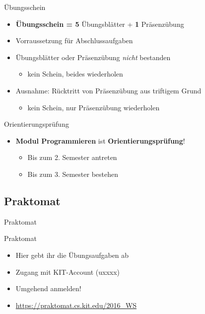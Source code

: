 \documentclass[18pt]{beamer}
\begin{document}
\begin{frame}{Übungsschein}
    \begin{itemize}
        \item \textbf{Übungsschein = \alert{5}} Übungsblätter + \textbf{\alert{1}} Präsenzübung
        \pause
        \item \alert{Vorraussetzung für Abschlussaufgaben}
        \pause
        \item Übungsblätter oder Präsenzübung \textit{nicht} bestanden
        \begin{itemize}
            \item kein Schein, beides wiederholen
        \end{itemize}
        \pause
        \item Ausnahme: Rücktritt von Präsenzübung aus triftigem Grund
        \begin{itemize}
            \item kein Schein, nur Präsenzübung wiederholen
        \end{itemize}
    \end{itemize}

\end{frame}

\begin{frame}{Orientierungsprüfung}
    \begin{itemize}
        \item \textbf{Modul Programmieren} ist \textbf{Orientierungsprüfung}!
        \begin{itemize}
            \item Bis zum 2. Semester antreten
            \item Bis zum 3. Semester bestehen
        \end{itemize}

    \end{itemize}
\end{frame}


\subsection{Praktomat}

\begin{frame}{Praktomat}
    \begin{block}{Praktomat}
        \begin{itemize}
            \item Hier gebt ihr die Übungsaufgaben ab
            \item Zugang mit KIT-Account (uxxxx)
            \item \alert{Umgehend anmelden!}
            \item \url{https://praktomat.cs.kit.edu/2016_WS}
        \end{itemize}
    \end{block}

\end{frame}
\end{document}
